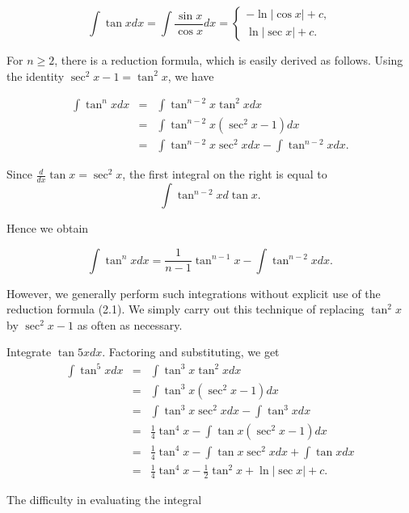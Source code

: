 $$
\int \tan x dx = \int \frac{\sin x}{\cos x} dx = 
\left \{ \begin{array}{r}
- \ln |\cos x| + c,\\
  \ln |\sec x| + c. 
\end{array}
\right.
$$

\noindent For $n \geq 2$, there is a reduction formula, which is easily derived as follows. 
Using the identity $\sec^{2} x - 1 = \tan^{2}x$, we have


\begin{eqnarray*}
\int \tan^{n}x dx &=& \int  \tan^{n-2}x \tan^{2}x dx\\
&=& \int \tan^{n-2} x (\sec^{2}x - 1)dx\\
&=& \int \tan^{n-2}x \sec^{2}x dx - \int \tan^{n-2}x dx.
\end{eqnarray*}

Since $\frac{d}{dx} \tan x = \sec^{2}x$, the first integral on the right is equal to
$$
\int \tan^{n-2} x d \tan x.
$$

Hence we obtain

\begin{theorem} %
$$
\int \tan^{n} x dx = \frac{1}{n -1} \tan^{n-1} x - \int \tan^{n -2}x dx. 
$$
\end{theorem}

\noindent However, we generally perform such integrations without explicit use of the reduction formula (2.1). We simply carry out this technique of replacing $\tan^{2}x$ by 
$\sec^{2}x - 1$ as often as necessary.

\begin{example}
Integrate $\tan 5x dx$. Factoring and substituting, we get
\begin{eqnarray*}
\int \tan^{5}x dx &=& \int \tan^{3}x \tan^{2}x dx \\
&=& \int \tan^{3}x(\sec^{2}x - 1)dx \\
&=& \int \tan^{3}x \sec^{2}x dx - \int \tan^{3}x dx \\
&=& \frac{1}{4} \tan^{4}x - \int \tan x (\sec^{2} x - 1 ) dx\\
&=& \frac{1}{4} \tan^{4} x - \int \tan x \sec^{2}x dx + \int \tan x dx \\
&=& \frac{1}{4} \tan^{4} x - \frac{1}{2} \tan^{2} x + \ln |\sec x| + c.
\end{eqnarray*}
\end{example}


The difficulty in evaluating the integral


